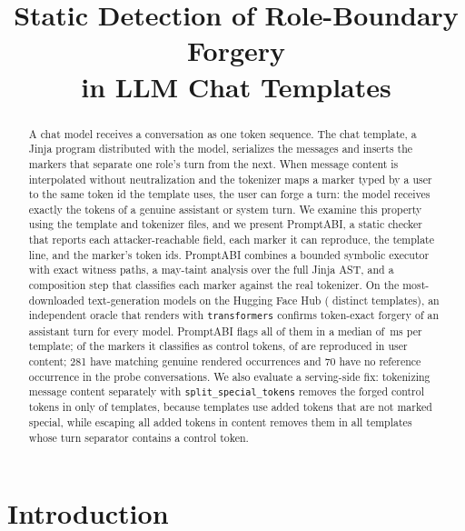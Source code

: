 \documentclass[10pt,conference]{IEEEtran}
\newcommand{\tool}{PromptABI\xspace}
\begin{document}
\title{Static Detection of Role-Boundary Forgery\\in LLM Chat Templates}

\author{}

\maketitle

\begin{abstract}
A chat model receives a conversation as one token sequence. The chat
template, a Jinja program distributed with the model, serializes the messages
and inserts the markers that separate one role's turn from the next. When
message content is interpolated without neutralization and the tokenizer maps a
marker typed by a user to the same token id the template uses, the user can
forge a turn: the model receives exactly the tokens of a genuine assistant or
system turn. We examine this property using the template and
tokenizer files, and we present \tool, a static checker that reports each
attacker-reachable field, each marker it can reproduce, the template line, and
the marker's token ids. \tool combines a bounded symbolic executor with exact
witness paths, a may-taint analysis over the full Jinja AST, and a composition
step that classifies each marker against the real tokenizer. On the
\NModels{} most-downloaded text-generation models on the Hugging Face Hub
(\NTemplates{} distinct templates), an independent oracle that renders with
\texttt{transformers} confirms token-exact forgery of an assistant turn for
every model. \tool flags all of them in a median of \TaintMedianMs{}\,ms per
template; of the markers it classifies as control tokens, \ConfCtrlConfirmed{}
of \ConfCtrlDecided{} are reproduced in user content; 281 have matching genuine
rendered occurrences and 70 have no reference occurrence in the probe conversations. We also evaluate a
serving-side fix: tokenizing message content separately with
\texttt{split\_special\_tokens} removes the forged control tokens in only
\MitBlockedSplit{} of \MitForgeable{} templates, because \MitResidualSplit{}
templates use added tokens that are not marked special, while escaping all
added tokens in content removes them in all \MitBlockedEscape{} templates whose
turn separator contains a control token.
\end{abstract}

\section{Introduction}
\end{document}
